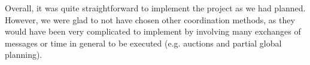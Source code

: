 Overall, it was quite straightforward to implement the project as we had planned. However, we were glad to not have chosen other coordination methods, as they would have been very complicated to implement by involving many exchanges of messages or time in general to be executed (e.g. auctions and partial global planning).